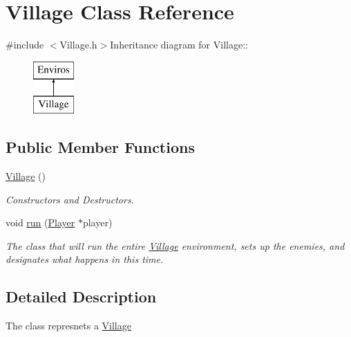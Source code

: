 \hypertarget{classVillage}{
\section{Village Class Reference}
\label{classVillage}
}


{\ttfamily \#include $<$Village.h$>$}Inheritance diagram for Village::\begin{figure}[H]
\begin{center}
\leavevmode
\includegraphics[height=2cm]{classVillage}
\end{center}
\end{figure}
\subsection*{Public Member Functions}
\begin{DoxyCompactItemize}
\item 
\hypertarget{classVillage_af67aec68ad865320e718b38e896c30d7}{
\hyperlink{classVillage_af67aec68ad865320e718b38e896c30d7}{Village} ()}
\label{classVillage_af67aec68ad865320e718b38e896c30d7}

\begin{DoxyCompactList}\small\item\em Constructors and Destructors. \item\end{DoxyCompactList}\item 
void \hyperlink{classVillage_ae03bedd05525bcfd997c1cfe1216025c}{run} (\hyperlink{classPlayer}{Player} $\ast$player)
\begin{DoxyCompactList}\small\item\em The class that will run the entire \hyperlink{classVillage}{Village} environment, sets up the enemies, and designates what happens in this time. \item\end{DoxyCompactList}\end{DoxyCompactItemize}


\subsection{Detailed Description}
The class represnets a \hyperlink{classVillage}{Village} 

